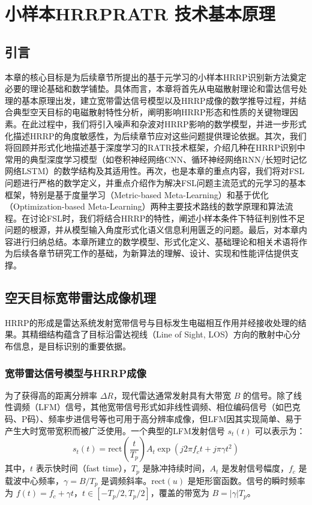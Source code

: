 \chapter{小样本HRRPRATR 技术基本原理}
\label{chap:theory}

\section{引言}
\label{sec:theory_intro}

本章的核心目标是为后续章节所提出的基于元学习的小样本HRRP识别新方法奠定必要的理论基础和数学铺垫。具体而言，本章将首先从电磁散射理论和雷达信号处理的基本原理出发，建立宽带雷达信号模型以及HRRP成像的数学推导过程，并结合典型空天目标的电磁散射特性分析，阐明影响HRRP形态和性质的关键物理因素。在此过程中，我们将引入噪声和杂波对HRRP影响的数学模型，并进一步形式化描述HRRP的角度敏感性，为后续章节应对这些问题提供理论依据。其次，我们将回顾并形式化地描述基于深度学习的RATR技术框架，介绍几种在HRRP识别中常用的典型深度学习模型（如卷积神经网络CNN、循环神经网络RNN/长短时记忆网络LSTM）的数学结构及其适用性。再次，也是本章的重点内容，我们将对FSL问题进行严格的数学定义，并重点介绍作为解决FSL问题主流范式的元学习的基本框架，特别是基于度量学习（Metric-based Meta-Learning）和基于优化（Optimization-based Meta-Learning）两种主要技术路线的数学原理和算法流程。在讨论FSL时，我们将结合HRRP的特性，阐述小样本条件下特征判别性不足问题的根源，并从模型输入角度形式化语义信息利用匮乏的问题。最后，对本章内容进行归纳总结。本章所建立的数学模型、形式化定义、基础理论和相关术语将作为后续各章节研究工作的基础，为新算法的理解、设计、实现和性能评估提供支撑。

\section{空天目标宽带雷达成像机理}
\label{sec:hrrp_mechanism}

HRRP的形成是雷达系统发射宽带信号与目标发生电磁相互作用并经接收处理的结果。其精细结构蕴含了目标沿雷达视线（Line of Sight, LOS）方向的散射中心分布信息，是目标识别的重要依据。

\subsection{宽带雷达信号模型与HRRP成像}
\label{subsec:hrrp_imaging_model}

为了获得高的距离分辨率 $\Delta R$，现代雷达通常发射具有大带宽 $B$ 的信号。除了线性调频（LFM）信号，其他宽带信号形式如非线性调频、相位编码信号（如巴克码、P码）、频率步进信号等也可用于高分辨率成像，但LFM因其实现简单、易于产生大时宽带宽积而被广泛使用。一个典型的LFM发射信号 $s_t(t)$ 可以表示为：
\begin{equation}
    s_t(t) = \text{rect}\left(\frac{t}{T_p}\right) A_t \exp\left(j 2\pi f_c t + j \pi \gamma t^2\right)
    \label{eq:lfm_signal}
\end{equation}
其中，$t$ 表示快时间（fast time），$T_p$ 是脉冲持续时间，$A_t$ 是发射信号幅度，$f_c$ 是载波中心频率，$\gamma = B / T_p$ 是调频斜率。$\text{rect}(u)$ 是矩形窗函数。信号的瞬时频率为 $f(t) = f_c + \gamma t$，$t \in [-T_p/2, T_p/2]$，覆盖的带宽为 $B = |\gamma| T_p$。


